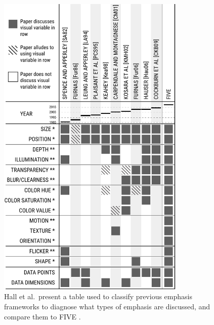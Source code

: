 \begin{figure}[p]
\begin{center}
\includegraphics[width=0.8\textwidth]{images/hall2016formalizingFull}
\caption{Hall et al.\ present a table used to classify previous emphasis frameworks to diagnose what types of emphasis are discussed, and compare them to FIVE \cite{hall2016formalizing}  .} \label{fig: hall2016formalizing}
\end{center}
\end{figure}

